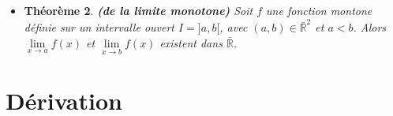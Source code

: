 \documentclass[10pt,a4paper,oneside]{article}
\newtheorem{theoreme}{Théorème}
\begin{document}
\begin{itemize}
\begin{theoreme} \textbf{(image d'un segment)}
Soit $f : [a,b] \to \mathbb{R}$ une fonction continue, avec $a < b$. Alors:

\begin{itemize}
\item
$f$ est majorée et admet un maximum

\item
$f$ est minorée et admet un minimum

\item
$f([a,b])$ est un segment
\end{itemize}
\end{theoreme}

\item
\begin{theoreme} \textbf{(de la limite monotone)}
Soit $f$ une fonction montone définie sur un intervalle ouvert $I = ]a,b[$, avec $(a,b) \in \bar{\mathbb{R}}^2$ et $a < b$. Alors $\underset{x \to a}{\lim} f(x)$ et $\underset{x \to b}{\lim} f(x)$ existent dans $\bar{\mathbb{R}}$.
\end{theoreme}

\end{itemize}

\section{Dérivation}
\end{document}
